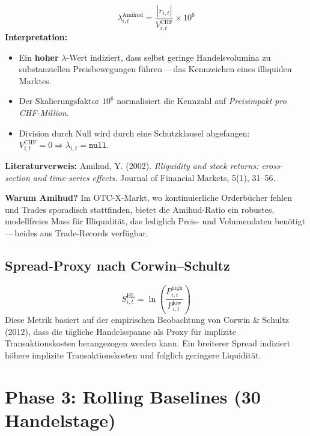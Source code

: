 \documentclass[12pt, a4paper, oneside]{report}
\begin{document}
\begin{mathbox}
\[
  \boxed{\;\lambda_{i,t}^{\text{Amihud}} = \frac{|r_{i,t}|}{V_{i,t}^{\text{CHF}}} \times 10^{6}\;}
\]
\textbf{Interpretation:}
\begin{itemize}
  \item Ein \textbf{hoher} $\lambda$-Wert indiziert, dass selbst geringe Handelsvolumina zu substanziellen Preisbewegungen f\"uhren\,---\,das Kennzeichen eines illiquiden Marktes.
  \item Der Skalierungsfaktor $10^6$ normalisiert die Kennzahl auf \textit{Preisimpakt pro CHF-Million}.
  \item Division durch Null wird durch eine Schutzklausel abgefangen: $V_{i,t}^{\text{CHF}} = 0 \Rightarrow \lambda_{i,t} = \texttt{null}$.
\end{itemize}

\textbf{Literaturverweis:} Amihud, Y. (2002). \textit{Illiquidity and stock returns: cross-section and time-series effects.} Journal of Financial Markets, 5(1), 31--56.
\end{mathbox}

\begin{insightbox}
\textbf{Warum Amihud?}\; Im OTC-X-Markt, wo kontinuierliche Orderb\"ucher fehlen und Trades sporadisch stattfinden, bietet die Amihud-Ratio ein robustes, modellfreies Mass f\"ur Illiquidit\"at, das lediglich Preis- und Volumendaten ben\"otigt\,---\,beides aus Trade-Records verf\"ugbar.
\end{insightbox}

\subsection{Spread-Proxy nach Corwin--Schultz}

\begin{mathbox}
\[
  S_{i,t}^{\text{HL}} = \ln\!\left(\frac{P_{i,t}^{\text{high}}}{P_{i,t}^{\text{low}}}\right)
\]
Diese Metrik basiert auf der empirischen Beobachtung von Corwin \& Schultz (2012), dass die t\"agliche Handelsspanne als Proxy f\"ur implizite Transaktionskosten herangezogen werden kann. Ein breiterer Spread indiziert h\"ohere implizite Transaktionskosten und folglich geringere Liquidit\"at.
\end{mathbox}

\section{Phase 3: Rolling Baselines (30 Handelstage)}
\end{document}
